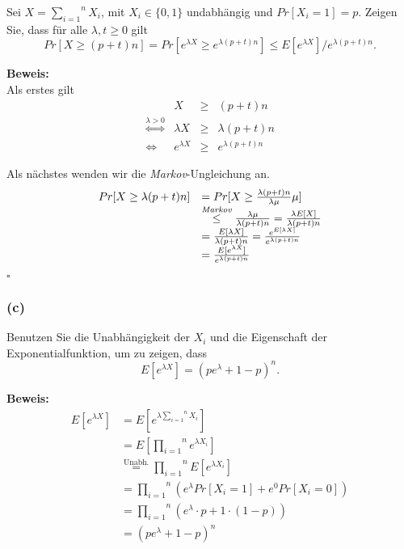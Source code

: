 \documentclass[11pt,a4paper,ngerman]{article}
\begin{document}
Sei $ X = \overset{n}{\underset{i=1}{\sum}} X_i$, mit $X_i \in \{ 0 , 1\}$ undabhängig und $Pr[X_i = 1] = p$. Zeigen Sie,
dass für alle $\lambda , t \geq 0$ gilt
$$
        Pr[X \geq (p + t)n] = Pr[e^{\lambda X} \geq e^{\lambda (p + t)n}] \leq E[e^{\lambda X}] / e^{\lambda(p+t)n}.
$$

\textbf{Beweis:}\\

Als erstes gilt
\begin{equation*}\begin{array}{crcl}
& X &\geq& (p + t)n\\
\stackrel{\lambda > 0}{\Leftrightarrow} & \lambda X & \geq & \lambda (p + t) n\\
\Leftrightarrow & e^{\lambda X} & \geq & e^{\lambda ( p + t) n}
\end{array}\end{equation*}

Als nächstes wenden wir die \emph{Markov}-Ungleichung an.
\begin{equation*}\begin{array}{rl}
    Pr[X \geq \lambda (p + t) n]
        &= Pr[X \geq \frac{\lambda (p + t) n}{\lambda \mu} \mu]\\
        &\stackrel{\emph{Markov}}{\leq} \frac{\lambda \mu}{\lambda (p + t) n}
        = \frac{\lambda E[X]}{\lambda (p + t) n}\\
        &= \frac{E[\lambda X]}{\lambda (p + t) n}
        = \frac{e^{E[\lambda X]}}{e^{\lambda (p + t) n}}\\
        &= \frac{E[e^{\lambda X}]}{e^{\lambda (p + t) n}}
\end{array}\end{equation*}

\mbox{}\hfill$\square$

\subsubsection*{(c)}

Benutzen Sie die Unabhängigkeit der $X_i$ und die Eigenschaft der Exponentialfunktion, um zu zeigen, dass
$$
    E[e^{\lambda X}] = (pe^\lambda + 1 - p)^n.
$$

\textbf{Beweis:}\\

\begin{equation*}\begin{split}
    E[e^{\lambda X}] &= E[e^{\lambda \overset{n}{\underset{i=1}{\sum}} X_i}]\\
        &= E[ \overset{n}{\underset{i=1}{\prod}} e^{\lambda X_i}]\\
        &\stackrel{\text{Unabh.}}{=} \overset{n}{\underset{i=1}{\prod}} E[e^{\lambda X_i}]\\
        &= \overset{n}{\underset{i=1}{\prod}} \left( e^{\lambda} Pr[X_i = 1] + e^0 Pr[X_i = 0] \right)\\
        &= \overset{n}{\underset{i=1}{\prod}} \left( e^{\lambda}\cdot p + 1 \cdot (1 - p) \right)\\
        &= \left( pe^\lambda + 1 - p \right)^n
\end{split}\end{equation*}
\end{document}
